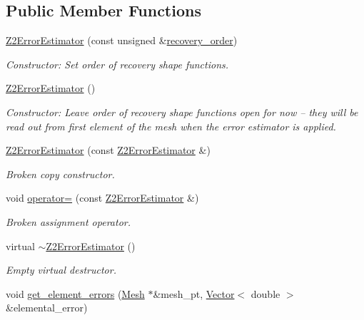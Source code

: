 \subsection*{Public Member Functions}
\begin{DoxyCompactItemize}
\item 
\hyperlink{classoomph_1_1Z2ErrorEstimator_a1cb0328af843a8bebf5333045cea4553}{Z2\+Error\+Estimator} (const unsigned \&\hyperlink{classoomph_1_1Z2ErrorEstimator_af7a3a28cfc05b291b438b80e87c7f5cc}{recovery\+\_\+order})
\begin{DoxyCompactList}\small\item\em Constructor\+: Set order of recovery shape functions. \end{DoxyCompactList}\item 
\hyperlink{classoomph_1_1Z2ErrorEstimator_a35186eeb792bf2b948239d19b2697ca0}{Z2\+Error\+Estimator} ()
\begin{DoxyCompactList}\small\item\em Constructor\+: Leave order of recovery shape functions open for now -- they will be read out from first element of the mesh when the error estimator is applied. \end{DoxyCompactList}\item 
\hyperlink{classoomph_1_1Z2ErrorEstimator_a4eb88b73062ae5dd42c597569179aeae}{Z2\+Error\+Estimator} (const \hyperlink{classoomph_1_1Z2ErrorEstimator}{Z2\+Error\+Estimator} \&)
\begin{DoxyCompactList}\small\item\em Broken copy constructor. \end{DoxyCompactList}\item 
void \hyperlink{classoomph_1_1Z2ErrorEstimator_a192eb7456b2174118b377bb74951dddf}{operator=} (const \hyperlink{classoomph_1_1Z2ErrorEstimator}{Z2\+Error\+Estimator} \&)
\begin{DoxyCompactList}\small\item\em Broken assignment operator. \end{DoxyCompactList}\item 
virtual \hyperlink{classoomph_1_1Z2ErrorEstimator_a3d1e540fe046f1c55d59690932d4095d}{$\sim$\+Z2\+Error\+Estimator} ()
\begin{DoxyCompactList}\small\item\em Empty virtual destructor. \end{DoxyCompactList}\item 
void \hyperlink{classoomph_1_1Z2ErrorEstimator_aa38b3ecfbb223a91bfe049d4722af6d3}{get\+\_\+element\+\_\+errors} (\hyperlink{classoomph_1_1Mesh}{Mesh} $\ast$\&mesh\+\_\+pt, \hyperlink{classoomph_1_1Vector}{Vector}$<$ double $>$ \&elemental\+\_\+error)

\end{DoxyCompactItemize}
